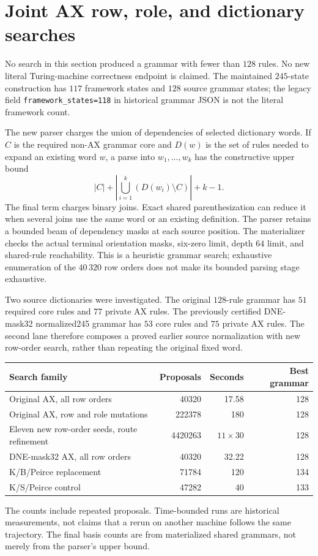 \section{Joint AX row, role, and dictionary searches}

No search in this section produced a grammar with fewer than $128$ rules.
No new literal Turing-machine correctness endpoint is claimed. The
maintained $245$-state construction has $117$ framework states and $128$ source
grammar states; the legacy field \texttt{framework\_states=118} in
historical grammar JSON is not the literal framework count.

The new parser charges the union of dependencies of selected dictionary
words. If $C$ is the required non-AX grammar core and $D(w)$ is the set of
rules needed to expand an existing word $w$, a parse into $w_1,\ldots,w_k$
has the constructive upper bound
\[
 |C|+\left|\bigcup_{i=1}^k(D(w_i)\setminus C)\right|+k-1.
\]
The final term charges binary joins. Exact shared parenthesization can
reduce it when several joins use the same word or an existing definition.
The parser retains a bounded beam of dependency masks at each source
position. The materializer checks the actual terminal orientation masks,
six-zero limit, depth $64$ limit, and shared-rule reachability. This is a
heuristic grammar search; exhaustive enumeration of the $40\,320$ row orders
does not make its bounded parsing stage exhaustive.

Two source dictionaries were investigated. The original $128$-rule grammar
has $51$ required core rules and $77$ private AX rules. The previously certified
DNE-mask32 normalized245 grammar has $53$ core rules and $75$ private AX rules.
The second lane therefore composes a proved earlier source normalization
with new row-order search, rather than repeating the original fixed word.

\begin{center}\small
\begin{tabular}{lrrr}
\toprule
Search family&Proposals&Seconds&Best grammar\\
\midrule
Original AX, all row orders&40320&17.58&128\\
Original AX, row and role mutations&222378&180&128\\
Eleven new row-order seeds, route refinement&4420263&$11\times30$&128\\
DNE-mask32 AX, all row orders&40320&32.22&128\\
K/B/Peirce replacement&71784&120&134\\
K/S/Peirce control&47282&40&133\\
\bottomrule
\end{tabular}
\end{center}
The counts include repeated proposals. Time-bounded runs are historical
measurements, not claims that a rerun on another machine follows the same
trajectory. The final basis counts are from materialized shared grammars,
not merely from the parser's upper bound.

